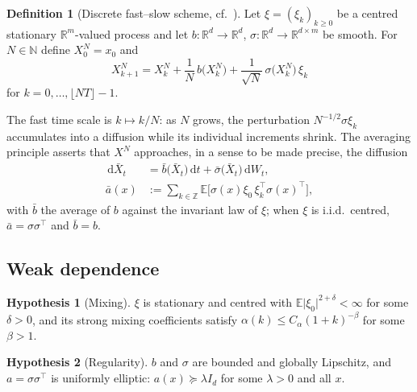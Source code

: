 \documentclass[a4paper,fleqn]{cas-dc}
\theoremstyle{definition}
\newtheorem{definition}[theorem]{Definition}
\newtheorem{hypothesis}{Hypothesis}
\newcommand{\R}{\mathbb{R}}
\newcommand{\E}{\mathbb{E}}
\newcommand{\dd}{\,\mathrm{d}}
\begin{document}
\begin{definition}[Discrete fast--slow scheme, cf.\ \cite{kifer2025}]
\label{def:scheme}
Let $\xi=(\xi_{k})_{k\ge 0}$ be a centred stationary $\R^{m}$-valued process and let
$b:\R^{d}\to\R^{d}$, $\sigma:\R^{d}\to\R^{d\times m}$ be smooth. For $N\in\mathbb{N}$
define $X^{N}_{0}=x_{0}$ and
\begin{equation}
X^{N}_{k+1} = X^{N}_{k} + \frac{1}{N}\,b\bigl(X^{N}_{k}\bigr)
+ \frac{1}{\sqrt{N}}\,\sigma\bigl(X^{N}_{k}\bigr)\,\xi_{k}
\label{eq:scheme}
\end{equation}
for $k=0,\dots,\lfloor NT\rfloor-1$.
\end{definition}

The fast time scale is $k\mapsto k/N$: as $N$ grows, the perturbation
$N^{-1/2}\sigma\xi_{k}$ accumulates into a diffusion while its individual increments
shrink. The averaging principle asserts that $X^{N}$ approaches, in a sense to be
made precise, the diffusion
\begin{equation}
\begin{split}
\dd \bar X_{t} &= \bar b\bigl(\bar X_{t}\bigr)\dd t + \bar\sigma\bigl(\bar X_{t}\bigr)\dd W_{t},\\
\bar a(x) &:= \sum_{k\in\mathbb{Z}} \E\bigl[\sigma(x)\xi_{0}\,\xi_{k}^{\top}\sigma(x)^{\top}\bigr],
\end{split}
\label{eq:limit}
\end{equation}
with $\bar b$ the average of $b$ against the invariant law of $\xi$; when $\xi$ is
i.i.d.\ centred, $\bar a = \sigma\sigma^{\top}$ and $\bar b = b$.

\subsection{Weak dependence}

\begin{hypothesis}[Mixing]
\label{hyp:mixing}
$\xi$ is stationary and centred with $\E\lvert\xi_{0}\rvert^{2+\delta}<\infty$ for
some $\delta>0$, and its strong mixing coefficients satisfy
$\alpha(k)\le C_{\alpha}(1+k)^{-\beta}$ for some $\beta>1$.
\end{hypothesis}

\begin{hypothesis}[Regularity]
\label{hyp:regular}
$b$ and $\sigma$ are bounded and globally Lipschitz, and $a=\sigma\sigma^{\top}$ is
uniformly elliptic: $a(x)\succeq \lambda I_{d}$ for some $\lambda>0$ and all $x$.
\end{hypothesis}
\end{document}
